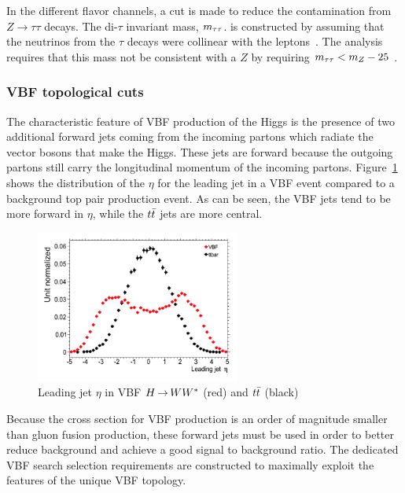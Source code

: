 In the different flavor channels, a cut is made to reduce the contamination from $Z\to\tau\tau$ decays. The di-$\tau$ invariant mass, $m_{\tau\tau}$. is constructed by assuming that the neutrinos from the $\tau$ decays were collinear with the leptons~\cite{collinear}. The analysis requires that this mass not be consistent with a $Z$ by requiring $m_{\tau\tau} < m_Z - 25$ \GeV. 

\subsubsection{VBF topological cuts}
\label{sec:vbf_topocuts}

The characteristic feature of VBF production of the Higgs is the presence of two additional forward jets coming from the incoming partons which radiate the vector bosons that make the Higgs. These jets are forward because the outgoing partons still carry the longitudinal momentum of the incoming partons. Figure~\ref{fig:VBF_LeadJetEta} shows the distribution of the $\eta$ for the leading jet in a VBF event compared to a background top pair production event. As can be seen, the VBF jets tend to be more forward in $\eta$, while the $t\bar{t}$ jets are more central. 

\begin{figure}[h!]
  \vspace{20pt}
  \centering
  \hspace*{-32pt}
  \includegraphics[width=0.6\textwidth]{figures/VBF_LeadJetEta}
  \caption{Leading jet $\eta$ in VBF $H{\,{\rightarrow}\,}WW^\ast$ (red) and $t\bar{t}$ (black)}
  \label{fig:VBF_LeadJetEta}
\end{figure}

Because the cross section for VBF production is an order of magnitude smaller than gluon fusion production, these forward jets must be used in order to better reduce background and achieve a good signal to background ratio. The dedicated VBF search selection requirements are constructed to maximally exploit the features of the unique VBF topology.

